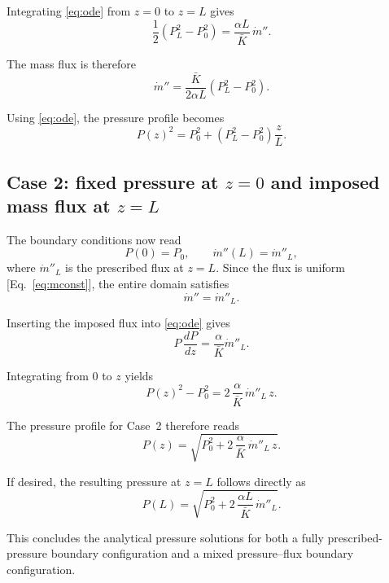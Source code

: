 Integrating \eqref{eq:ode} from $z=0$ to $z=L$ gives
\begin{equation}
\frac{1}{2}\left(P_L^2 - P_0^2\right)
=
\frac{\alpha L}{\bar{K}}\,\dot{m}''.
\end{equation}

The mass flux is therefore
\begin{equation}
\dot{m}'' = \frac{\bar{K}}{2\alpha L}\left(P_L^2 - P_0^2\right).
\label{eq:flux_case1}
\end{equation}

Using \eqref{eq:ode}, the pressure profile becomes
\begin{equation}
P(z)^2
=
P_0^2
+
\left(P_L^2 - P_0^2\right)\frac{z}{L}.
\label{eq:profile_case1}
\end{equation}

\subsection{Case 2: fixed pressure at $z=0$ and imposed mass flux at $z=L$}
\label{ann:analytical_pressure2}
The boundary conditions now read
\begin{equation}
P(0)=P_0,
\qquad
\dot{m}''(L)=\dot{m}''_{\!L},
\end{equation}
where $\dot{m}''_{\!L}$ is the prescribed flux at $z=L$.  
Since the flux is uniform [Eq.~\eqref{eq:mconst}], the entire domain satisfies
\begin{equation}
\dot{m}'' = \dot{m}''_{\!L}.
\label{eq:flux_case2}
\end{equation}

Inserting the imposed flux into \eqref{eq:ode} gives
\begin{equation}
P\,\frac{dP}{dz}
=
\frac{\alpha}{\bar{K}}\dot{m}''_{\!L}.
\end{equation}

Integrating from $0$ to $z$ yields
\begin{equation}
P(z)^2 - P_0^2
=
2\,\frac{\alpha}{\bar{K}}\,\dot{m}''_{\!L}\,z .
\end{equation}

The pressure profile for Case~2 therefore reads
\begin{equation}
P(z)
=
\sqrt{
P_0^2
+
2\,\frac{\alpha}{\bar{K}}\,\dot{m}''_{\!L}\,z
}.
\label{eq:profile_case2}
\end{equation}

If desired, the resulting pressure at $z=L$ follows directly as
\begin{equation}
P(L)
=
\sqrt{
P_0^2
+
2\,\frac{\alpha L}{\bar{K}}\,\dot{m}''_{\!L}
}.
\end{equation}

This concludes the analytical pressure solutions for both a fully prescribed-pressure boundary configuration and a mixed pressure–flux boundary configuration.

